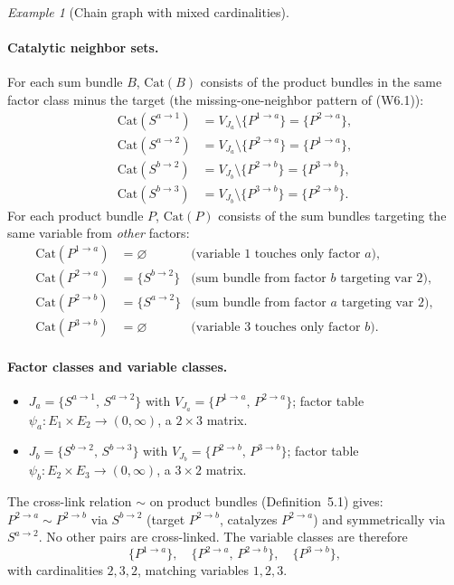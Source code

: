 \documentclass{article}
\theoremstyle{plain}
\theoremstyle{definition}
\theoremstyle{remark}
\newtheorem{example}{Example}[section]
\newcommand{\<}{\langle}
\renewcommand{\>}{\rangle}
\begin{document}
\begin{example}[Chain graph with mixed cardinalities]
\paragraph{Catalytic neighbor sets.}
For each sum bundle $B$, $\mathrm{Cat}(B)$ consists of the product bundles
in the same factor class minus the target (the missing-one-neighbor
pattern of (W6.1)):
\begin{align*}
\mathrm{Cat}(S^{a\to 1}) &= V_{J_a}\setminus\{P^{1\to a}\} = \{P^{2\to a}\}, \\
\mathrm{Cat}(S^{a\to 2}) &= V_{J_a}\setminus\{P^{2\to a}\} = \{P^{1\to a}\}, \\
\mathrm{Cat}(S^{b\to 2}) &= V_{J_b}\setminus\{P^{2\to b}\} = \{P^{3\to b}\}, \\
\mathrm{Cat}(S^{b\to 3}) &= V_{J_b}\setminus\{P^{3\to b}\} = \{P^{2\to b}\}.
\end{align*}
For each product bundle $P$, $\mathrm{Cat}(P)$ consists of the sum bundles
targeting the same variable from \emph{other} factors:
\begin{align*}
\mathrm{Cat}(P^{1\to a}) &= \varnothing
  &\text{(variable $1$ touches only factor $a$)}, \\
\mathrm{Cat}(P^{2\to a}) &= \{S^{b\to 2}\}
  &\text{(sum bundle from factor $b$ targeting var $2$)}, \\
\mathrm{Cat}(P^{2\to b}) &= \{S^{a\to 2}\}
  &\text{(sum bundle from factor $a$ targeting var $2$)}, \\
\mathrm{Cat}(P^{3\to b}) &= \varnothing
  &\text{(variable $3$ touches only factor $b$)}.
\end{align*}
 
 
\paragraph{Factor classes and variable classes.}
\begin{itemize}
\item $J_a = \{S^{a\to 1},\, S^{a\to 2}\}$ with
      $V_{J_a} = \{P^{1\to a},\, P^{2\to a}\}$;
      factor table $\psi_a : E_1\times E_2\to(0,\infty)$, a $2\times 3$ matrix.
\item $J_b = \{S^{b\to 2},\, S^{b\to 3}\}$ with
      $V_{J_b} = \{P^{2\to b},\, P^{3\to b}\}$;
      factor table $\psi_b : E_2\times E_3\to(0,\infty)$, a $3\times 2$ matrix.
\end{itemize}
 
\noindent
The cross-link relation $\sim$ on product bundles (Definition~5.1) gives:
$P^{2\to a}\sim P^{2\to b}$ via $S^{b\to 2}$ (target $P^{2\to b}$,
catalyzes $P^{2\to a}$) and symmetrically via $S^{a\to 2}$.
No other pairs are cross-linked.
The variable classes are therefore
\[
\{P^{1\to a}\},\quad \{P^{2\to a},\, P^{2\to b}\},\quad \{P^{3\to b}\},
\]
with cardinalities $2,3,2$, matching variables $1,2,3$.
 

\end{example}
\end{document}
